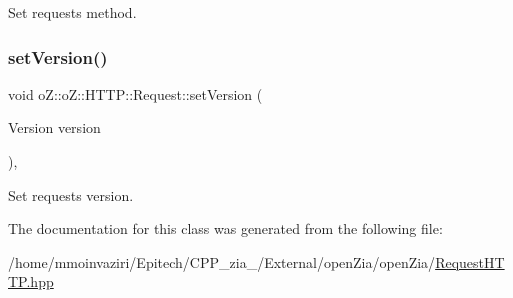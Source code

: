 Set request\textquotesingle{}s method. 

\mbox{\label{classo_z_1_1o_z_1_1_h_t_t_p_1_1_request_a1678781402c85346e87000fe154338ad}} 
\subsubsection{\texorpdfstring{setVersion()}{setVersion()}}
{\footnotesize\ttfamily void o\+Z\+::o\+Z\+::\+H\+T\+T\+P\+::\+Request\+::set\+Version (\begin{DoxyParamCaption}\item[{Version}]{version }\end{DoxyParamCaption})\hspace{0.3cm}{\ttfamily [inline]}, {\ttfamily [noexcept]}}



Set request\textquotesingle{}s version. 



The documentation for this class was generated from the following file\+:\begin{DoxyCompactItemize}
\item 
/home/mmoinvaziri/\+Epitech/\+C\+P\+P\+\_\+zia\+\_/\+External/open\+Zia/open\+Zia/\mbox{\hyperlink{_request_h_t_t_p_8hpp}{Request\+H\+T\+T\+P.\+hpp}}\end{DoxyCompactItemize}
